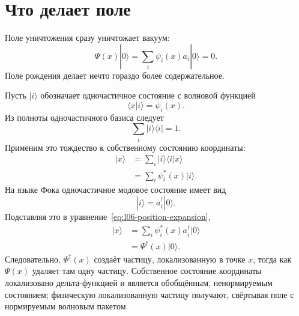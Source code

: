 \section{Что делает поле}

Поле уничтожения сразу уничтожает вакуум:
\begin{equation}
\Psi(x)|0\rangle
=\sum_i\psi_i(x)a_i|0\rangle
=0.
\label{eq:l06-field-kills-vacuum}
\end{equation}
Поле рождения делает нечто гораздо более содержательное.

Пусть \(|i\rangle\) обозначает одночастичное состояние с волновой функцией
\begin{equation}
\langle x|i\rangle=\psi_i(x).
\end{equation}
Из полноты одночастичного базиса следует
\begin{equation}
\sum_i|i\rangle\langle i|=1.
\label{eq:l06-completeness}
\end{equation}
Применим это тождество к собственному состоянию координаты:
\begin{align}
|x\rangle
&=\sum_i|i\rangle\langle i|x\rangle \\
&=\sum_i\psi_i^*(x)|i\rangle.
\label{eq:l06-position-expansion}
\end{align}
На языке Фока одночастичное модовое состояние имеет вид
\begin{equation}
|i\rangle=a_i^\dagger|0\rangle.
\end{equation}
Подставляя это в уравнение~\eqref{eq:l06-position-expansion},
\begin{align}
|x\rangle
&=\sum_i\psi_i^*(x)a_i^\dagger|0\rangle \\
&=\Psi^\dagger(x)|0\rangle.
\label{eq:l06-local-creation}
\end{align}
Следовательно, \(\Psi^\dagger(x)\) создаёт частицу, локализованную в точке \(x\), тогда как \(\Psi(x)\) удаляет там одну частицу. Собственное состояние координаты локализовано дельта-функцией и является обобщённым, ненормируемым состоянием; физическую локализованную частицу получают, свёртывая поле с нормируемым волновым пакетом.

\begin{classroomqa}
\end{classroomqa}

